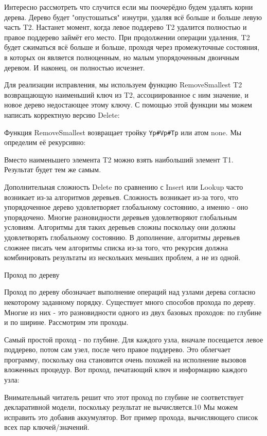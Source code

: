Интересно рассмотреть что случится если мы поочерёдно будем удалять корни дерева. Дерево будет "опустошаться" изнутри, удаляя всё больше и больше левую часть T2. Настанет момент, когда левое поддерево T2 удалится полностью и правое поддерево займёт его место. При продолжении операции удаления, T2 будет сжиматься всё больше и больше, проходя через промежуточные состояния, в которых он является полноценным, но малым упорядоченным двоичным деревом. И наконец, он полностью исчезнет.

Для реализации исправления, мы используем функцию {RemoveSmallest T2} возвращающую наименьший ключ из T2, ассоциированное с ним значение, и новое дерево недостающее этому ключу. С помощью этой функции мы можем написать корректную версию Delete:

Функция RemoveSmallest возвращает тройку \verb|Yp#Vp#Tp| или атом none. Мы определим её рекурсивно:

Вместо наименьшего элемента T2 можно взять наибольший элемент T1. Результат будет тем же самым.

Дополнительная сложность Delete по сравнению с Insert или Lookup часто возникает из-за алгоритмов деревьев. Сложность возникает из-за того, что упорядоченное дерево удовлетворяет глобальному состоянию, а именно - оно упорядочено. Многие разновидности деревьев удовлетворяют глобальным условиям. Алгоритмы для таких деревьев сложны поскольку они должны удовлетворять глобальному состоянию. В дополнение, алгоритмы деревьев сложнее писать чем алгоритмы списка из-за того, что рекурсия должна комбинировать результаты из нескольких меньших проблем, а не из одной.

Проход по дереву

Проход по дереву обозначает выполнение операций над узлами дерева согласно некоторому заданному порядку. Существует много способов прохода по дереву. Многие из них - это разновидности одного из двух базовых проходов: по глубине и по ширине. Рассмотрим эти проходы.

Самый простой проход - по глубине. Для каждого узла, вначале посещается левое поддерево, потом сам узел, после чего правое поддерево. Это облегчает программу, поскольку она становится очень похожей на исполнение вызовов вложенных процедур. Вот проход, печатающий ключ и информацию каждого узла:

Внимательный читатель решит что этот проход по глубине не соответствует декларативной модели, поскольку результат не вычисляется.10 Мы можем исправить это добавив аккумулятор. Вот пример прохода, вычисляющего список всех пар ключей/значений.

